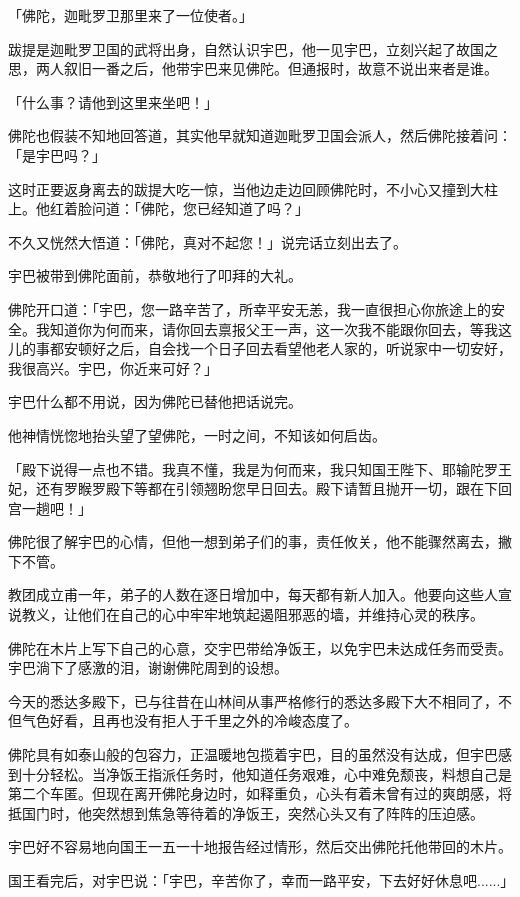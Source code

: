 \documentclass[12pt,twoside,openany]{book}
\begin{document}
「佛陀，迦毗罗卫那里来了一位使者。」

跋提是迦毗罗卫国的武将出身，自然认识宇巴，他一见宇巴，立刻兴起了故国之思，两人叙旧一番之后，他带宇巴来见佛陀。但通报时，故意不说出来者是谁。

「什么事？请他到这里来坐吧！」

佛陀也假装不知地回答道，其实他早就知道迦毗罗卫国会派人，然后佛陀接着问：「是宇巴吗？」

这时正要返身离去的跋提大吃一惊，当他边走边回顾佛陀时，不小心又撞到大柱上。他红着脸问道：「佛陀，您已经知道了吗？」

不久又恍然大悟道：「佛陀，真对不起您！」说完话立刻出去了。

宇巴被带到佛陀面前，恭敬地行了叩拜的大礼。

佛陀开口道：「宇巴，您一路辛苦了，所幸平安无恙，我一直很担心你旅途上的安全。我知道你为何而来，请你回去禀报父王一声，这一次我不能跟你回去，等我这儿的事都安顿好之后，自会找一个日子回去看望他老人家的，听说家中一切安好，我很高兴。宇巴，你近来可好？」

宇巴什么都不用说，因为佛陀已替他把话说完。

他神情恍惚地抬头望了望佛陀，一时之间，不知该如何启齿。

「殿下说得一点也不错。我真不懂，我是为何而来，我只知国王陛下、耶输陀罗王妃，还有罗睺罗殿下等都在引领翘盼您早日回去。殿下请暂且抛开一切，跟在下回宫一趟吧！」

佛陀很了解宇巴的心情，但他一想到弟子们的事，责任攸关，他不能骤然离去，撇下不管。

教团成立甫一年，弟子的人数在逐日增加中，每天都有新人加入。他要向这些人宣说教义，让他们在自己的心中牢牢地筑起遏阻邪恶的墙，并维持心灵的秩序。

佛陀在木片上写下自己的心意，交宇巴带给净饭王，以免宇巴未达成任务而受责。宇巴淌下了感激的泪，谢谢佛陀周到的设想。

今天的悉达多殿下，已与往昔在山林间从事严格修行的悉达多殿下大不相同了，不但气色好看，且再也没有拒人于千里之外的冷峻态度了。

佛陀具有如泰山般的包容力，正温暖地包揽着宇巴，目的虽然没有达成，但宇巴感到十分轻松。当净饭王指派任务时，他知道任务艰难，心中难免颓丧，料想自己是第二个车匿。但现在离开佛陀身边时，如释重负，心头有着未曾有过的爽朗感，将抵国门时，他突然想到焦急等待着的净饭王，突然心头又有了阵阵的压迫感。

宇巴好不容易地向国王一五一十地报告经过情形，然后交出佛陀托他带回的木片。

国王看完后，对宇巴说：「宇巴，辛苦你了，幸而一路平安，下去好好休息吧......」
\end{document}
